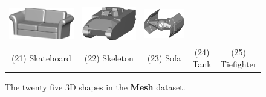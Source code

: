 \begin{figure}[ht!]
\begin{tabular}{ccccc}
	\includegraphics[width=0.15\linewidth]{./fig/eval/23sofa.png} \hspace{0mm} &
	\includegraphics[width=0.15\linewidth]{./fig/eval/24tank.png} \hspace{0mm} & 
	\includegraphics[width=0.15\linewidth]{./fig/eval/25tiefighter.png} \hspace{0mm} \\ 
	(21) Skateboard & (22) Skeleton & (23) Sofa & (24) Tank & (25) Tiefighter
\end{tabular}
\caption{The twenty five 3D shapes in the \textbf{Mesh} dataset.}
\label{fig:sampleshapes}
\end{figure}
